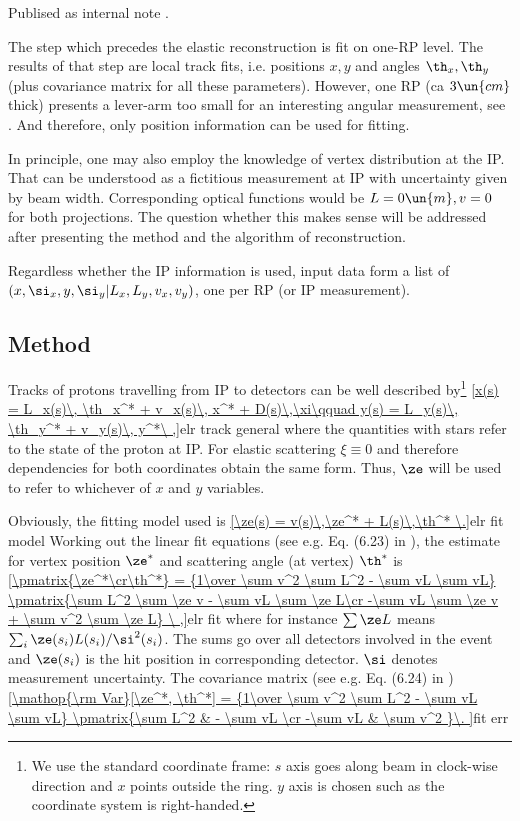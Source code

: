 Publised as internal note .

The step which precedes the elastic reconstruction is fit on one-RP level. The results of that step are local track fits, i.e. positions $x, y$ and angles $\th_x, \th_y$ (plus covariance matrix for all these parameters). However, one RP (ca $3\un{cm}$ thick) presents a lever-arm too small for an interesting angular measurement, see . And therefore, only position information can be used for fitting.

In principle, one may also employ the knowledge of vertex distribution at the IP. That can be understood as a fictitious measurement at IP with uncertainty given by beam width. Corresponding optical functions would be $L = 0\un{m}, v = 0$ for both projections. The question whether this makes sense will be addressed after presenting the method and the algorithm of reconstruction.

Regardless whether the IP information is used, input data form a list of $(x, \si_x, y, \si_y|\penalty0 L_x, L_y, v_x, v_y)$, one per RP (or IP measurement).




\subsection[method]{Method}
Tracks of protons travelling from IP to detectors can be well described by\footnote{We use the standard coordinate frame: $s$ axis goes along beam in clock-wise direction and $x$ points outside the ring. $y$ axis is chosen such as the coordinate system is right-handed.}
\eqref{x(s) = L_x(s)\, \th_x^* + v_x(s)\, x^* + D(s)\,\xi\qquad y(s) = L_y(s)\, \th_y^* + v_y(s)\, y^*\ ,}{elr track general}
where the quantities with stars refer to the state of the proton at IP. For elastic scattering $\xi\equiv 0$ and therefore dependencies for both coordinates obtain the same form. Thus, $\ze$ will be used to refer to whichever of $x$ and $y$ variables.

Obviously, the fitting model used is
\eqref{\ze(s) = v(s)\,\ze^* + L(s)\,\th^* \.}{elr fit model}
Working out the linear fit equations (see e.g. Eq. (6.23) in ), the estimate for vertex position $\ze^*$ and scattering angle (at vertex) $\th^*$ is
\eqref{\pmatrix{\ze^*\cr\th^*} = {1\over \sum v^2 \sum L^2 - \sum vL \sum vL} \pmatrix{\sum L^2 \sum \ze v - \sum vL \sum \ze L\cr -\sum vL \sum \ze v + \sum v^2 \sum \ze L} \ ,}{elr fit}
where for instance $\sum \ze L$ means $\sum_{i} \ze(s_i) L(s_i) / \si^2(s_i)$. The sums go over all detectors involved in the event and $\ze(s_i)$ is the hit position in corresponding detector. $\si$ denotes measurement uncertainty. The covariance matrix (see e.g. Eq. (6.24) in )
\eqref{\mathop{\rm Var}[\ze^*, \th^*] = {1\over \sum v^2 \sum L^2 - \sum vL \sum vL} \pmatrix{\sum L^2 & - \sum vL \cr -\sum vL & \sum v^2 }\.
}{fit err}

